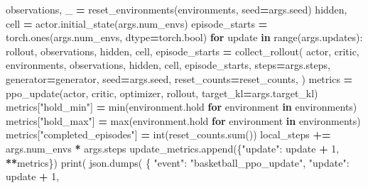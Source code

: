 \documentclass[
  chinese,
  11pt,
  letterpaper,
]{article}
\newenvironment{Shaded}{\begin{snugshade}}{\end{snugshade}}
\newcommand{\BuiltInTok}[1]{#1}
\newcommand{\ControlFlowTok}[1]{\textcolor[rgb]{0.13,0.29,0.53}{\textbf{#1}}}
\newcommand{\DecValTok}[1]{\textcolor[rgb]{0.00,0.00,0.81}{#1}}
\newcommand{\KeywordTok}[1]{\textcolor[rgb]{0.13,0.29,0.53}{\textbf{#1}}}
\newcommand{\NormalTok}[1]{#1}
\newcommand{\OperatorTok}[1]{\textcolor[rgb]{0.81,0.36,0.00}{\textbf{#1}}}
\newcommand{\StringTok}[1]{\textcolor[rgb]{0.31,0.60,0.02}{#1}}
\renewenvironment{Shaded}{\par\smallskip}{\par\smallskip}
\begin{document}
\begin{Shaded}
\begin{Highlighting}[]
\NormalTok{        observations, \_ }\OperatorTok{=}\NormalTok{ reset\_environments(environments, seed}\OperatorTok{=}\NormalTok{args.seed)}
\NormalTok{        hidden, cell }\OperatorTok{=}\NormalTok{ actor.initial\_state(args.num\_envs)}
\NormalTok{        episode\_starts }\OperatorTok{=}\NormalTok{ torch.ones(args.num\_envs, dtype}\OperatorTok{=}\NormalTok{torch.}\BuiltInTok{bool}\NormalTok{)}
        \ControlFlowTok{for}\NormalTok{ update }\KeywordTok{in} \BuiltInTok{range}\NormalTok{(args.updates):}
\NormalTok{            rollout, observations, hidden, cell, episode\_starts }\OperatorTok{=}\NormalTok{ collect\_rollout(}
\NormalTok{                actor,}
\NormalTok{                critic,}
\NormalTok{                environments,}
\NormalTok{                observations,}
\NormalTok{                hidden,}
\NormalTok{                cell,}
\NormalTok{                episode\_starts,}
\NormalTok{                steps}\OperatorTok{=}\NormalTok{args.steps,}
\NormalTok{                generator}\OperatorTok{=}\NormalTok{generator,}
\NormalTok{                seed}\OperatorTok{=}\NormalTok{args.seed,}
\NormalTok{                reset\_counts}\OperatorTok{=}\NormalTok{reset\_counts,}
\NormalTok{            )}
\NormalTok{            metrics }\OperatorTok{=}\NormalTok{ ppo\_update(actor, critic, optimizer, rollout, target\_kl}\OperatorTok{=}\NormalTok{args.target\_kl)}
\NormalTok{            metrics[}\StringTok{"hold\_min"}\NormalTok{] }\OperatorTok{=} \BuiltInTok{min}\NormalTok{(environment.hold }\ControlFlowTok{for}\NormalTok{ environment }\KeywordTok{in}\NormalTok{ environments)}
\NormalTok{            metrics[}\StringTok{"hold\_max"}\NormalTok{] }\OperatorTok{=} \BuiltInTok{max}\NormalTok{(environment.hold }\ControlFlowTok{for}\NormalTok{ environment }\KeywordTok{in}\NormalTok{ environments)}
\NormalTok{            metrics[}\StringTok{"completed\_episodes"}\NormalTok{] }\OperatorTok{=} \BuiltInTok{int}\NormalTok{(reset\_counts.}\BuiltInTok{sum}\NormalTok{())}
\NormalTok{            local\_steps }\OperatorTok{+=}\NormalTok{ args.num\_envs }\OperatorTok{*}\NormalTok{ args.steps}
\NormalTok{            update\_metrics.append(\{}\StringTok{"update"}\NormalTok{: update }\OperatorTok{+} \DecValTok{1}\NormalTok{, }\OperatorTok{**}\NormalTok{metrics\})}
            \BuiltInTok{print}\NormalTok{(}
\NormalTok{                json.dumps(}
\NormalTok{                    \{}
                        \StringTok{"event"}\NormalTok{: }\StringTok{"basketball\_ppo\_update"}\NormalTok{,}
                        \StringTok{"update"}\NormalTok{: update }\OperatorTok{+} \DecValTok{1}\NormalTok{,}

\end{Highlighting}
\end{Shaded}
\end{document}
